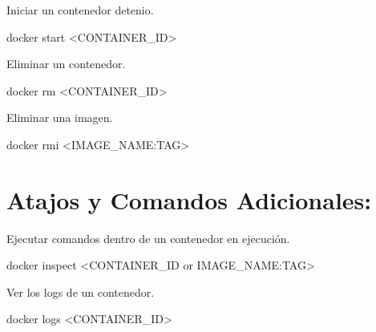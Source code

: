 \documentclass[
  a4paper,
  DIV=11,
  numbers=noendperiod,
  onepage,
  openany]{scrreprt}
\newenvironment{Shaded}{\begin{snugshade}}{\end{snugshade}}
\newcommand{\ExtensionTok}[1]{\textcolor[rgb]{0.00,0.23,0.31}{#1}}
\newcommand{\NormalTok}[1]{\textcolor[rgb]{0.00,0.23,0.31}{#1}}
\newcommand{\OperatorTok}[1]{\textcolor[rgb]{0.37,0.37,0.37}{#1}}
\begin{document}
Iniciar un contenedor detenio.

\begin{Shaded}
\begin{Highlighting}[]
\ExtensionTok{docker}\NormalTok{ start }\OperatorTok{\textless{}}\NormalTok{CONTAINER\_ID}\OperatorTok{\textgreater{}}
\end{Highlighting}
\end{Shaded}

Eliminar un contenedor.

\begin{Shaded}
\begin{Highlighting}[]
\ExtensionTok{docker}\NormalTok{ rm }\OperatorTok{\textless{}}\NormalTok{CONTAINER\_ID}\OperatorTok{\textgreater{}}
\end{Highlighting}
\end{Shaded}

Eliminar una imagen.

\begin{Shaded}
\begin{Highlighting}[]
\ExtensionTok{docker}\NormalTok{ rmi }\OperatorTok{\textless{}}\NormalTok{IMAGE\_NAME:TAG}\OperatorTok{\textgreater{}}
\end{Highlighting}
\end{Shaded}

\section{Atajos y Comandos
Adicionales:}\label{atajos-y-comandos-adicionales}

Ejecutar comandos dentro de un contenedor en ejecución.

\begin{Shaded}
\begin{Highlighting}[]
\ExtensionTok{docker}\NormalTok{ inspect }\OperatorTok{\textless{}}\NormalTok{CONTAINER\_ID or IMAGE\_NAME:TAG}\OperatorTok{\textgreater{}}
\end{Highlighting}
\end{Shaded}

Ver los logs de un contenedor.

\begin{Shaded}
\begin{Highlighting}[]
\ExtensionTok{docker}\NormalTok{ logs }\OperatorTok{\textless{}}\NormalTok{CONTAINER\_ID}\OperatorTok{\textgreater{}}
\end{Highlighting}
\end{Shaded}
\end{document}
